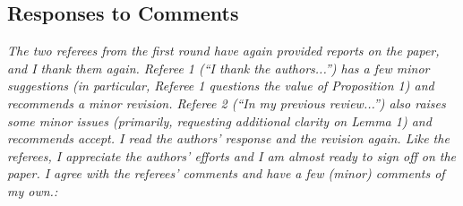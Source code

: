 \documentclass[11pt]{article}
\newcommand{\1}{\ensuremath{\mathbf{1}}} %
\theoremstyle{thm-sf}
\begin{document}
	\subsection{Responses to Comments}
	{\it The two referees from the first round have again provided reports on the paper, and I thank them again. Referee 1 (“I thank the authors...”) has a few minor suggestions (in particular, Referee 1 questions the value of Proposition 1) and recommends a minor revision. Referee 2 (“In my previous review...”) also raises some minor issues (primarily, requesting additional clarity on Lemma 1) and recommends accept.
		I read the authors’ response and the revision again. Like the referees, I appreciate the authors’ efforts and I am almost ready to sign off on the paper. I agree with the referees’ comments and have a few (minor) comments of my own.:
	} 
\newline
\end{document}
